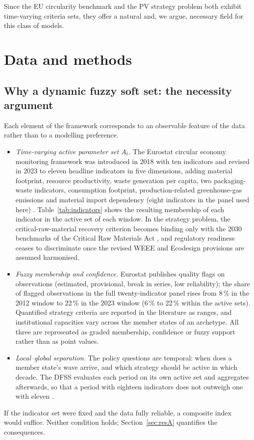 \documentclass[a4paper,fleqn]{cas-sc}
\begin{document}
Since the EU circularity benchmark and the PV strategy problem both exhibit time-varying criteria sets, they offer a natural and, we argue, necessary field for this class of models.

\section{Data and methods}\label{sec:methods}

\subsection{Why a dynamic fuzzy soft set: the necessity argument}\label{sec:necessity}
Each element of the framework corresponds to an observable feature of the data rather than to a modelling preference.
\begin{itemize}
\item \emph{Time-varying active parameter set $A_t$.} The Eurostat circular economy monitoring framework was introduced in 2018 with ten indicators and revised in 2023 to eleven headline indicators in five dimensions, adding material footprint, resource productivity, waste generation per capita, two packaging-waste indicators, consumption footprint, production-related greenhouse-gas emissions and material import dependency (eight indicators in the panel used here) \citep{ec2018framework,ec2023framework}. Table~\ref{tab:indicators} shows the resulting membership of each indicator in the active set of each window. In the strategy problem, the critical-raw-material recovery criterion becomes binding only with the 2030 benchmarks of the Critical Raw Materials Act \citep{crma2024}, and regulatory readiness ceases to discriminate once the revised WEEE and Ecodesign provisions are assumed harmonised.
\item \emph{Fuzzy membership and confidence.} Eurostat publishes quality flags on observations (estimated, provisional, break in series, low reliability); the share of flagged observations in the full twenty-indicator panel rises from 8\,\% in the 2012 window to 22\,\% in the 2023 window (6\,\% to 22\,\% within the active sets). Quantified strategy criteria are reported in the literature as ranges, and institutional capacities vary across the member states of an archetype. All three are represented as graded membership, confidence or fuzzy support rather than as point values.
\item \emph{Local--global separation.} The policy questions are temporal: when does a member state's wave arrive, and which strategy should be active in which decade. The DFSS evaluates each period on its own active set and aggregates afterwards, so that a period with eighteen indicators does not outweigh one with eleven \citep{SAEED2026200504}.
\end{itemize}
If the indicator set were fixed and the data fully reliable, a composite index would suffice. Neither condition holds; Section~\ref{sec:resA} quantifies the consequences.
\end{document}
